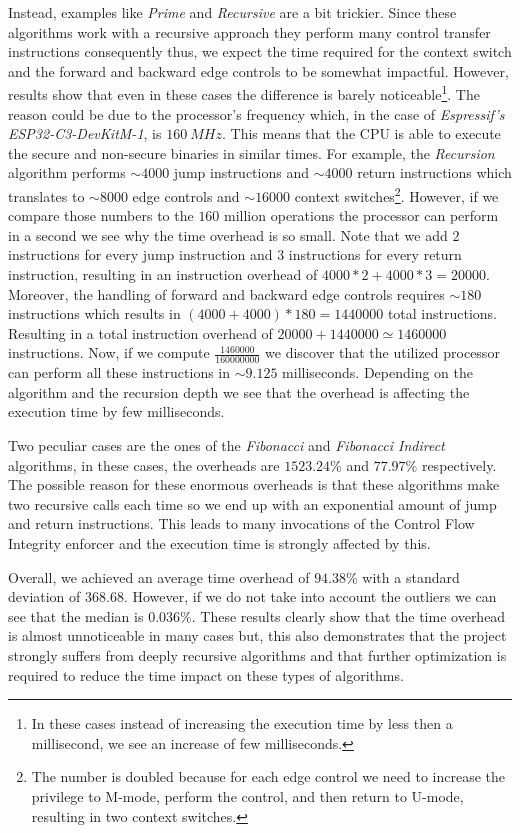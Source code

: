Instead, examples like \textit{Prime} and \textit{Recursive} are a bit trickier.
Since these algorithms work with a recursive approach they perform many control transfer
instructions consequently thus, we expect the time required for the context
switch and the forward and backward edge controls to be somewhat impactful. However,
results show that even in these cases the difference is barely noticeable\footnote{In
these cases instead of increasing the execution time by less then a millisecond,
we see an increase of few milliseconds.}. The reason could be due to the
processor's frequency which, in the case of \textit{Espressif's ESP32-C3-DevKitM-1},
is $160 \ MHz$. This means that the CPU is able to execute the secure and non-secure
binaries in similar times. For example, the \textit{Recursion} algorithm performs
$\sim 4000$ jump instructions and $\sim 4000$ return instructions which translates
to $\sim 8000$ edge controls and $\sim 16000$ context switches\footnote{The
number is doubled because for each edge control we need to increase the
privilege to M-mode, perform the control, and then return to U-mode, resulting in
two context switches.}. However, if we compare those numbers to the $160$
million operations the processor can perform in a second we see why the time
overhead is so small. Note that we add $2$ instructions for every jump instruction
and $3$ instructions for every return instruction, resulting in an instruction
overhead of $4000*2 + 4000*3 = 20000$. Moreover, the handling of forward and
backward edge controls requires $\sim 180$ instructions which results in
$(4000 + 4000) * 180 = 1440000$ total instructions. Resulting in a total instruction
overhead of $20000 + 1440000 \simeq 1460000$ instructions. Now, if we compute $\frac{1460000}{160000000}$
we discover that the utilized processor can perform all these instructions in $\sim
9.125$ milliseconds. Depending on the algorithm and the recursion depth we see
that the overhead is affecting the execution time by few milliseconds.

Two peculiar cases are the ones of the \textit{Fibonacci} and \textit{Fibonacci
Indirect} algorithms, in these cases, the overheads are $1523.24\%$ and
$77.97\%$ respectively. The possible reason for these enormous overheads is that
these algorithms make two recursive calls each time so we end up with an exponential
amount of jump and return instructions. This leads to many invocations of the
Control Flow Integrity enforcer and the execution time is strongly affected by
this.

Overall, we achieved an average time overhead of $94.38\%$ with a standard deviation
of $368.68$. However, if we do not take into account the outliers we can see that
the median is $0.036\%$. These results clearly show that the time overhead is
almost unnoticeable in many cases but, this also demonstrates that the project strongly
suffers from deeply recursive algorithms and that further optimization is required
to reduce the time impact on these types of algorithms.

